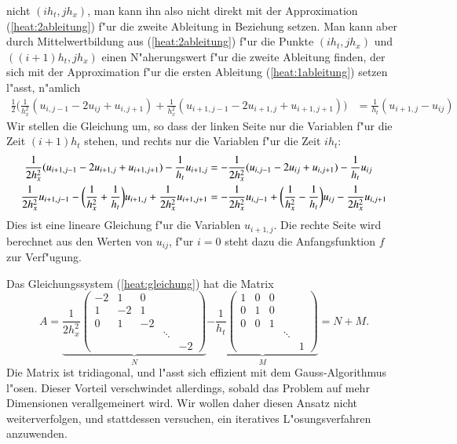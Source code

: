 nicht $(ih_t,jh_x)$, man kann ihn also nicht direkt mit der
Approximation (\ref{heat:2ableitung}) f"ur die zweite Ableitung
in Beziehung setzen.
Man kann aber durch Mittelwertbildung aus (\ref{heat:2ableitung}) f"ur
die Punkte $(ih_t, jh_x)$ und $((i+1)h_t, jh_x)$ einen N"aherungswert
f"ur die zweite Ableitung finden, der sich mit der Approximation
f"ur die ersten Ableitung (\ref{heat:1ableitung}) setzen l"asst,
n"amlich
\begin{align}
\frac12\biggl(
\frac1{h_x^2}(u_{i,j-1}-2u_{ij}+u_{i,j+1})
+
\frac1{h_x^2}(u_{i+1,j-1}-2u_{i+1,j}+u_{i+1,j+1})
\biggr)
&=
\frac1{h_t}(u_{i+1,j}-u_{ij})
\label{heat:diskret}
\end{align}
Wir stellen die Gleichung um, so dass der linken Seite nur die 
Variablen f"ur die Zeit $(i+1)h_t$ stehen, und rechts nur die
Variablen f"ur die Zeit $ih_t$:
\begin{align}
\frac1{2h_x^2}(u_{i+1,j-1}-2u_{i+1,j}+u_{i+1,j+1})-\frac1{h_t}u_{i+1,j}
&=
-\frac1{2h_x^2}(u_{i,j-1}-2u_{ij}+u_{i,j+1})-\frac1{h_t}u_{ij}
\notag
\\
\frac1{2h_x^2}u_{i+1,j-1}
-\biggl(\frac1{h_x^2}+\frac1{h_t}\biggr)u_{i+1,j}
+\frac1{2h_x^2} u_{i+1,j+1}
&=
-\frac1{2h_x^2}u_{i,j-1}
+\biggl(\frac1{h_x^2}-\frac1{h_t}\biggr)u_{ij}
-\frac1{2h_x^2} u_{i,j+1}
\label{heat:gleichung}
\end{align}
Dies ist eine lineare Gleichung f"ur die Variablen $u_{i+1,j}$.
Die rechte Seite wird berechnet aus den Werten von $u_{ij}$,
f"ur $i=0$ steht dazu die Anfangsfunktion $f$ zur Verf"ugung.

Das Gleichungssystem (\ref{heat:gleichung}) hat die Matrix
\begin{equation}
A=
\underbrace{
\frac1{2h_x^2}
\begin{pmatrix}
-2& 1& 0&      &  \\
 1&-2& 1&      &  \\
 0& 1&-2&      &  \\
  &  &  &\ddots&  \\
  &  &  &      &-2
\end{pmatrix}}_N
\underbrace{
-\frac1{h_t}
\begin{pmatrix}
 1& 0& 0&      &  \\
 0& 1& 0&      &  \\
 0& 0& 1&      &  \\
  &  &  &\ddots&  \\
  &  &  &      & 1
\end{pmatrix}}_M
=N + M.
\label{heat:zerlegung}
\end{equation}
Die Matrix ist tridiagonal, und l"asst sich effizient mit dem
Gauss-Algorithmus l"osen.
Dieser Vorteil verschwindet allerdings, sobald das Problem auf
mehr Dimensionen verallgemeinert wird.
Wir wollen daher diesen Ansatz nicht weiterverfolgen, und stattdessen
versuchen, ein iteratives L"osungsverfahren anzuwenden.

